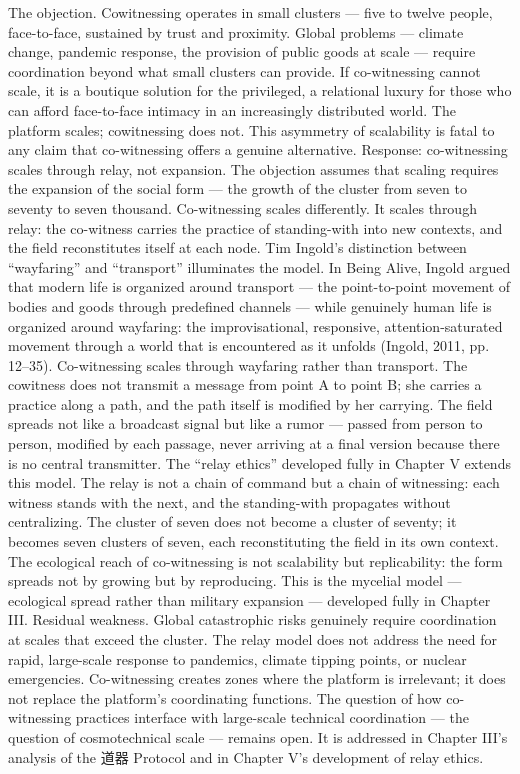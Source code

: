 The objection. Cowitnessing operates in small clusters — five to twelve people, face-to-face, sustained by trust and proximity. Global problems — climate change, pandemic response, the provision of public goods at scale — require coordination beyond what small clusters can provide. If co-witnessing cannot scale, it is a boutique solution for the privileged, a relational luxury for those who can afford face-to-face intimacy in an increasingly distributed world. The platform scales; cowitnessing does not. This asymmetry of scalability is fatal to any claim that co-witnessing offers a genuine alternative. Response: co-witnessing scales through relay, not expansion. The objection assumes that scaling requires the expansion of the social form — the growth of the cluster from seven to seventy to seven thousand. Co-witnessing scales differently. It scales through relay: the co-witness carries the practice of standing-with into new contexts, and the field reconstitutes itself at each node. Tim Ingold’s distinction between “wayfaring” and “transport” illuminates the model. In Being Alive, Ingold argued that modern life is organized around transport — the point-to-point movement of bodies and goods through predefined channels — while genuinely human life is organized around wayfaring: the improvisational, responsive, attention-saturated movement through a world that is encountered as it unfolds (Ingold, 2011, pp. 12–35). Co-witnessing scales through wayfaring rather than transport. The cowitness does not transmit a message from point A to point B; she carries a practice along a path, and the path itself is modified by her carrying. The field spreads not like a broadcast signal but like a rumor — passed from person to person, modified by each passage, never arriving at a final version because there is no central transmitter. The “relay ethics” developed fully in Chapter V extends this model. The relay is not a chain of command but a chain of witnessing: each witness stands with the next, and the standing-with propagates without centralizing. The cluster of seven does not become a cluster of seventy; it becomes seven clusters of seven, each reconstituting the field in its own context. The ecological reach of co-witnessing is not scalability but replicability: the form spreads not by growing but by reproducing. This is the mycelial model — ecological spread rather than military expansion — developed fully in Chapter III. Residual weakness. Global catastrophic risks genuinely require coordination at scales that exceed the cluster. The relay model does not address the need for rapid, large-scale response to pandemics, climate tipping points, or nuclear emergencies. Co-witnessing creates zones where the platform is irrelevant; it does not replace the platform’s coordinating functions. The question of how co-witnessing practices interface with large-scale technical coordination — the question of cosmotechnical scale — remains open. It is addressed in Chapter III’s analysis of the 道器 Protocol and in Chapter V’s development of relay ethics.


